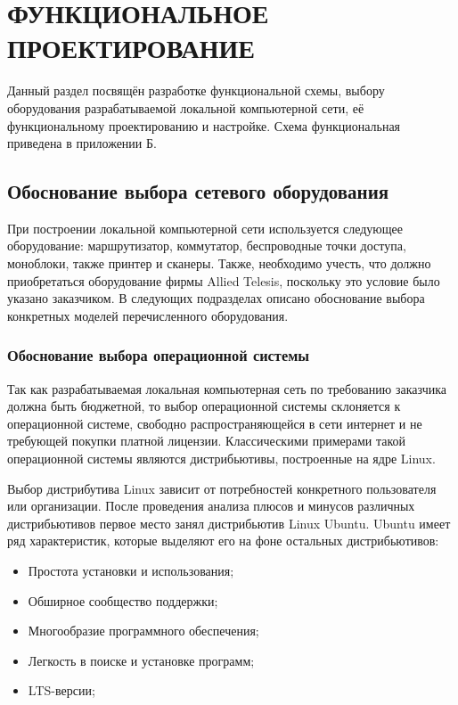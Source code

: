 \section{ФУНКЦИОНАЛЬНОЕ ПРОЕКТИРОВАНИЕ}
\label{sec:func}

Данный раздел посвящён разработке функциональной схемы, выбору оборудования
разрабатываемой локальной компьютерной сети, её функциональному проектированию и настройке.
Схема функциональная приведена в приложении Б.

\subsection{Обоснование выбора сетевого оборудования}\label{subsec:func:Equipment}

При построении локальной компьютерной сети используется следующее оборудование:
маршрутизатор, коммутатор, беспроводные точки доступа, моноблоки, также принтер и сканеры.
Также, необходимо учесть, что должно приобретаться оборудование фирмы Allied Telesis, поскольку это условие было указано заказчиком.
В следующих подразделах описано обоснование выбора конкретных моделей перечисленного оборудования.

\subsubsection{Обоснование выбора операционной системы}\label{subsubsec:func:OSChoice}

    Так как разрабатываемая локальная компьютерная сеть по требованию заказчика должна быть бюджетной,
    то выбор операционной системы склоняется к операционной системе,
    свободно распространяющейся в сети интернет и не требующей покупки платной лицензии.
    Классическими примерами такой операционной системы являются дистрибьютивы, построенные на ядре Linux.

    Выбор дистрибутива Linux зависит от потребностей конкретного пользователя или организации.
    После проведения анализа плюсов и минусов различных дистрибьютивов первое место занял дистрибьютив Linux Ubuntu.
    Ubuntu имеет ряд характеристик, которые выделяют его на фоне остальных дистрибьютивов:

    \begin{itemize}
        \item Простота установки и использования;
        \item Обширное сообщество поддержки;
        \item Многообразие программного обеспечения;
        \item Легкость в поиске и установке программ;
        \item LTS-версии;
    \end{itemize}

